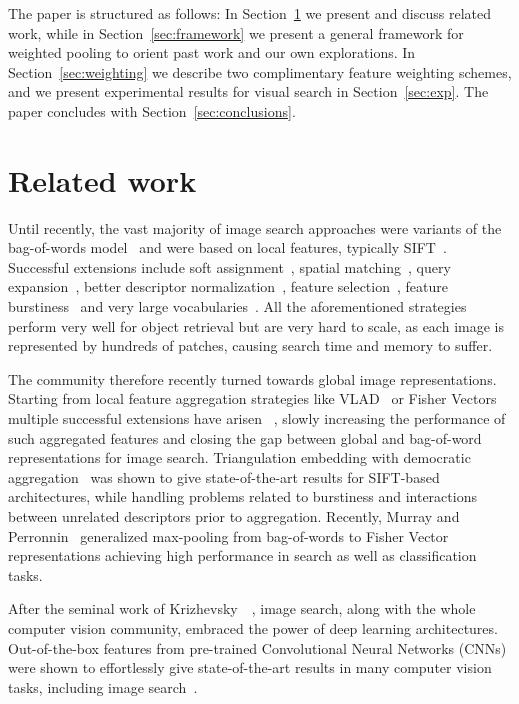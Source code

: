 \documentclass[runningheads]{llncs}
\begin{document}
The paper is structured as follows: In Section~\ref{sec:related} we present and discuss related work, while in Section~\ref{sec:framework} we present a general framework for weighted pooling to orient past work and our own explorations. In Section~\ref{sec:weighting} we describe two complimentary feature weighting schemes, and we present experimental results for visual search in Section~\ref{sec:exp}. The paper concludes with Section~\ref{sec:conclusions}. \section{Related work}
\label{sec:related}

Until recently, the vast majority of image search approaches were variants of the bag-of-words model~\cite{SiZi03} and were based on local features, typically SIFT~\cite{Lowe01}. 
Successful extensions include soft assignment~\cite{PCS+08}, spatial matching~\cite{PCI+07,AvTo13}, query expansion~\cite{CPS+07, CMPM11, ArZi12, ToJe14}, better descriptor normalization~\cite{ArZi12}, feature selection~\cite{TuLo09,TKAK14}, feature burstiness~\cite{JeDS09} and very large vocabularies~\cite{MPCM10}. 
All the aforementioned strategies perform very well for object retrieval but are  very hard to scale, as each image is represented by hundreds of patches, causing search time and memory to suffer.

The community therefore recently turned towards global image representations. Starting from local feature aggregation strategies like VLAD~\cite{JDSP10} or Fisher Vectors~\cite{PLSP10} multiple successful extensions have arisen
~\cite{ToAJ13,DGJP13,GMJP14,ToJA15},
slowly increasing the performance of such aggregated features and closing the gap between global and bag-of-word representations for image search. Triangulation embedding with democratic aggregation~\cite{JeZi14} was shown to give state-of-the-art results for SIFT-based architectures, while handling problems related to burstiness and interactions between unrelated descriptors prior to aggregation. Recently, Murray and Perronnin~\cite{MuPe14} generalized max-pooling from bag-of-words to Fisher Vector representations achieving high performance in search as well as classification tasks.

After the seminal work of Krizhevsky~\etal~\cite{KrSH12}, image search, along with the whole computer vision community, embraced the power of deep learning architectures. Out-of-the-box features from pre-trained Convolutional Neural Networks (CNNs) were shown to effortlessly give state-of-the-art results in many computer vision tasks, including image search~\cite{RASC14}.
\end{document}
